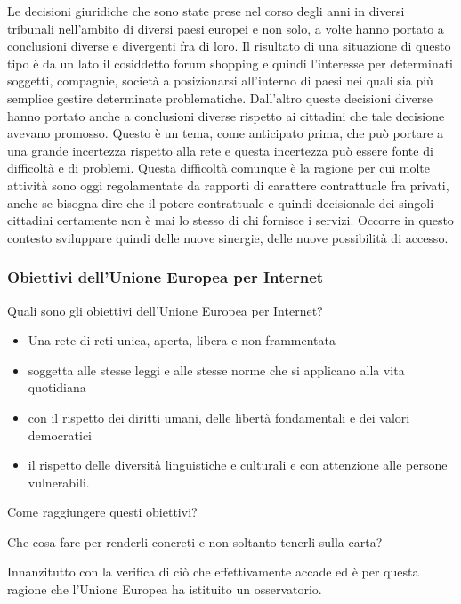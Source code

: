 Le decisioni giuridiche che sono state prese nel corso degli anni in diversi tribunali nell'ambito di diversi paesi europei e non solo, a volte hanno portato a conclusioni diverse e divergenti fra di loro. Il risultato di una situazione di questo tipo è da un lato il cosiddetto forum shopping e quindi l'interesse per determinati soggetti, compagnie, società a posizionarsi all'interno di paesi nei quali sia più semplice gestire determinate problematiche. Dall'altro queste decisioni diverse hanno portato anche a conclusioni diverse rispetto ai cittadini che tale decisione avevano promosso. Questo è un tema, come anticipato prima, che può portare a una grande incertezza rispetto alla rete e questa incertezza può essere fonte di difficoltà e di problemi. Questa difficoltà comunque è la ragione per cui molte attività sono oggi regolamentate da rapporti di carattere contrattuale fra privati, anche se bisogna dire che il potere contrattuale e quindi decisionale dei singoli cittadini certamente non è mai lo stesso di chi fornisce i servizi. Occorre in questo contesto sviluppare quindi delle nuove sinergie, delle nuove possibilità di accesso.

\subsubsection{Obiettivi dell'Unione Europea per Internet}

Quali sono gli obiettivi dell'Unione Europea per Internet?

\begin{itemize}
    \item Una rete di reti unica, aperta, libera e non frammentata
    \item soggetta alle stesse leggi e alle stesse norme che si applicano alla vita quotidiana
    \item con il rispetto dei diritti umani, delle libertà fondamentali e dei valori democratici
    \item il rispetto delle diversità linguistiche e culturali e con attenzione alle persone vulnerabili.
\end{itemize}

Come raggiungere questi obiettivi? 

Che cosa fare per renderli concreti e non soltanto tenerli sulla carta? 

Innanzitutto con la verifica di ciò che effettivamente accade ed è per questa ragione che l'Unione Europea ha istituito un osservatorio.

